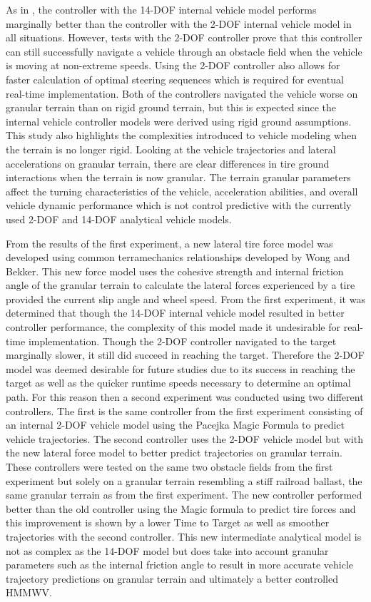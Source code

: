 \documentclass[12pt,onecolumn]{report}
\begin{document}
As in \cite{ModelFidelity2016}, the controller with the 14-DOF internal vehicle model performs marginally better than the controller with the 2-DOF internal vehicle model in all situations. However, tests with the 2-DOF controller prove that this controller can still successfully navigate a vehicle through an obstacle field when the vehicle is moving at non-extreme speeds. Using the 2-DOF controller also allows for faster calculation of optimal steering sequences which is required for eventual real-time implementation. Both of the controllers navigated the vehicle worse on granular terrain than on rigid ground terrain, but this is expected since the internal vehicle controller models were derived using rigid ground assumptions. This study also highlights the complexities introduced to vehicle modeling when the terrain is no longer rigid. Looking at the vehicle trajectories and lateral accelerations on granular terrain, there are clear differences in tire ground interactions when the terrain is now granular. The terrain granular parameters affect the turning characteristics of the vehicle, acceleration abilities, and overall vehicle dynamic performance which is not control predictive with the currently used 2-DOF and 14-DOF analytical vehicle models. 

From the results of the first experiment, a new lateral tire force model was developed using common terramechanics relationships developed by Wong and Bekker. This new force model uses the cohesive strength and internal friction angle of the granular terrain to calculate the lateral forces experienced by a tire provided the current slip angle and wheel speed. From the first experiment, it was determined that though the 14-DOF internal vehicle model resulted in better controller performance, the complexity of this model made it undesirable for real-time implementation. Though the 2-DOF controller navigated to the target marginally slower, it still did succeed in reaching the target. Therefore the 2-DOF model was deemed desirable for future studies due to its success in reaching the target as well as the quicker runtime speeds necessary to determine an optimal path. For this reason then a second experiment was conducted using two different controllers. The first is the same controller from the first experiment consisting of an internal 2-DOF vehicle model using the Pacejka Magic Formula to predict vehicle trajectories. The second controller uses the 2-DOF vehicle model but with the new lateral force model to better predict trajectories on granular terrain. These controllers were tested on the same two obstacle fields from the first experiment but solely on a granular terrain resembling a stiff railroad ballast, the same granular terrain as from the first experiment. The new controller performed better than the old controller using the Magic formula to predict tire forces and this improvement is shown by a lower Time to Target as well as smoother trajectories with the second controller. This new intermediate analytical model is not as complex as the 14-DOF model but does take into account granular parameters such as the internal friction angle to result in more accurate vehicle trajectory predictions on granular terrain and ultimately a better controlled HMMWV. 
\end{document}
